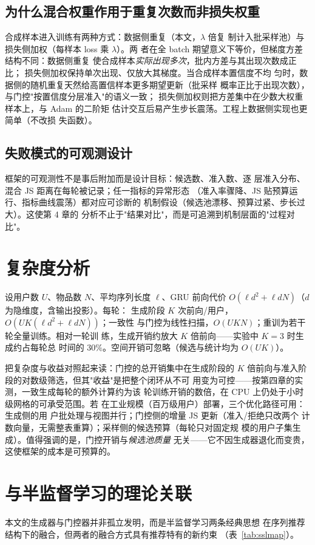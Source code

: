 \subsection{为什么混合权重作用于重复次数而非损失权重}
合成样本进入训练有两种方式：数据侧重复（本文，$\lambda$ 倍复
制计入批采样池）与损失侧加权（每样本 loss 乘 $\lambda$）。两
者在全 batch 期望意义下等价，但梯度方差结构不同：数据侧重复
使合成样本\emph{实际出现多次}，批内方差与其出现次数成正比；
损失侧加权保持单次出现、仅放大其梯度。当合成样本置信度不均
匀时，数据侧的随机重复天然给高置信样本更多期望更新（批采样
概率正比于出现次数），与门控"按置信度分层准入"的语义一致；
损失侧加权则把方差集中在少数大权重样本上，与 Adam 的二阶矩
估计交互后易产生步长震荡。工程上数据侧实现也更简单（不改损
失函数）。

\subsection{失败模式的可观测设计}
框架的可观测性不是事后附加而是设计目标：候选数、准入数、逐
层准入分布、混合 JS 距离在每轮被记录；任一指标的异常形态
（准入率骤降、JS 贴预算运行、指标曲线震荡）都对应可诊断的
机制假设（候选池漂移、预算过紧、步长过大）。这使第 4 章的
分析不止于"结果对比"，而是可追溯到机制层面的"过程对比"。

\section{复杂度分析}
设用户数 $U$、物品数 $N$、平均序列长度 $\ell$、GRU 前向代价
$O(\ell d^2 + \ell d N)$（$d$ 为隐维度，含输出投影）。每轮：
生成阶段 $K$ 次前向/用户，$O(UK(\ell d^2 + \ell dN))$；一致性
与门控为线性扫描，$O(UKN)$；重训为若干轮全量训练。相对一轮训
练，生成开销约放大 $K$ 倍前向——实验中 $K=3$ 时生成约占每轮总
时间的 $30\%$。空间开销可忽略（候选与统计均为 $O(UK)$）。

把复杂度与收益对照起来读：门控的总开销集中在生成阶段的 $K$
倍前向与准入阶段的对数级筛选，但其"收益"是把整个闭环从不可
用变为可控——按第四章的实测，一致生成每轮的额外计算约为该
轮训练开销的数倍，在 CPU 上仍处于小时级网格的可承受范围。若
在工业规模（百万级用户）部署，三个优化路径可用：生成侧的用
户批处理与视图并行；门控侧的增量 JS 更新（准入/拒绝只改两个
计数向量，无需整表重算）；采样侧的候选预算（每轮只对固定规
模的用户子集生成）。值得强调的是，门控开销与\emph{候选池质量
}无关——它不因生成器退化而变贵，这使框架的成本是可预算的。

\section{与半监督学习的理论关联}
本文的生成器与门控器并非孤立发明，而是半监督学习两条经典思想
在序列推荐结构下的融合，但两者的融合方式具有推荐特有的新约束
（表~\ref{tab:sslmap}）。

